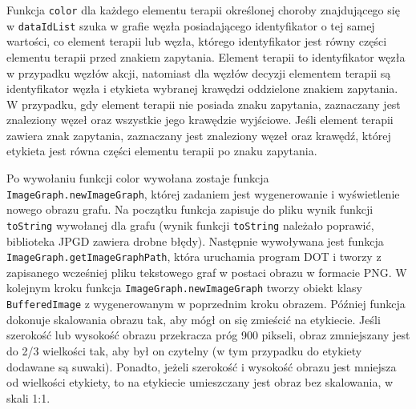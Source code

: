 Funkcja \texttt{color} dla każdego elementu terapii określonej choroby znajdującego się w \texttt{dataIdList} szuka w grafie węzła posiadającego identyfikator o tej samej wartości, co element terapii lub węzła, którego identyfikator jest równy części elementu terapii przed znakiem zapytania. Element terapii to identyfikator węzła w przypadku węzłów akcji, natomiast dla węzłów decyzji elementem terapii są identyfikator węzła i etykieta wybranej krawędzi oddzielone znakiem zapytania.
W przypadku, gdy element terapii nie posiada znaku zapytania, zaznaczany jest znaleziony węzeł oraz wszystkie jego krawędzie wyjściowe.  Jeśli element terapii zawiera znak zapytania, zaznaczany jest znaleziony węzeł oraz krawędź, której etykieta jest równa części elementu terapii po znaku zapytania.
 
Po wywołaniu funkcji color wywołana zostaje funkcja \texttt{ImageGraph.newImageGraph}, której zadaniem jest wygenerowanie i wyświetlenie nowego obrazu grafu. Na początku funkcja zapisuje do pliku wynik funkcji \texttt{toString} wywołanej dla grafu (wynik funkcji \texttt{toString} należało poprawić, biblioteka JPGD zawiera drobne błędy). Następnie wywoływana jest funkcja \texttt{ImageGraph.getImageGraphPath}, która uruchamia program DOT i tworzy z zapisanego wcześniej pliku tekstowego graf w postaci obrazu w formacie PNG. W kolejnym kroku funkcja \texttt{ImageGraph.newImageGraph} tworzy obiekt klasy \texttt{BufferedImage} z wygenerowanym w poprzednim kroku obrazem. Później funkcja dokonuje skalowania obrazu tak, aby mógł on się zmieścić na etykiecie. 
Jeśli szerokość lub wysokość obrazu przekracza próg 900 pikseli, obraz zmniejszany jest do 2/3 wielkości tak, aby był on czytelny (w tym przypadku do etykiety dodawane są suwaki). Ponadto, jeżeli szerokość i wysokość obrazu jest mniejsza od wielkości etykiety, to na etykiecie umieszczany jest obraz bez skalowania, w skali 1:1.
 
